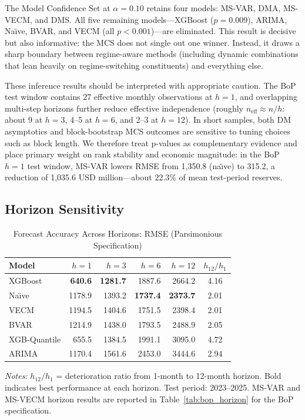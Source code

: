 \documentclass[12pt,a4paper]{article}
\begin{document}
The Model Confidence Set at $\alpha = 0.10$ retains four models: MS-VAR, DMA, MS-VECM, and DMS. All five remaining models---XGBoost ($p = 0.009$), ARIMA, Na\"{\i}ve, BVAR, and VECM (all $p < 0.001$)---are eliminated. This result is decisive but also informative: the MCS does not single out one winner. Instead, it draws a sharp boundary between regime-aware methods (including dynamic combinations that lean heavily on regime-switching constituents) and everything else.

These inference results should be interpreted with appropriate caution. The BoP test window contains 27 effective monthly observations at $h=1$, and overlapping multi-step horizons further reduce effective independence (roughly $n_{\text{eff}} \approx n/h$: about 9 at $h=3$, 4--5 at $h=6$, and 2--3 at $h=12$). In short samples, both DM asymptotics and block-bootstrap MCS outcomes are sensitive to tuning choices such as block length. We therefore treat p-values as complementary evidence and place primary weight on rank stability and economic magnitude: in the BoP $h=1$ test window, MS-VAR lowers RMSE from 1,350.8 (na\"{\i}ve) to 315.2, a reduction of 1,035.6 USD million---about 22.3\% of mean test-period reserves.

\subsection{Horizon Sensitivity}

\begin{table}[htbp]
\centering
\caption{Forecast Accuracy Across Horizons: RMSE (Parsimonious Specification)}
\label{tab:horizon}
\begin{tabular}{lrrrrc}
\toprule
Model & $h = 1$ & $h = 3$ & $h = 6$ & $h = 12$ & $h_{12}/h_1$ \\
\midrule
XGBoost & \textbf{640.6} & \textbf{1281.7} & 1887.6 & 2664.2 & 4.16 \\
Na\"{\i}ve & 1178.9 & 1393.2 & \textbf{1737.4} & \textbf{2373.7} & 2.01 \\
VECM & 1194.5 & 1404.6 & 1751.5 & 2398.4 & 2.01 \\
BVAR & 1214.9 & 1438.0 & 1793.5 & 2488.9 & 2.05 \\
XGB-Quantile & 655.5 & 1384.5 & 1991.1 & 3095.0 & 4.72 \\
ARIMA & 1170.4 & 1561.6 & 2453.0 & 3444.6 & 2.94 \\
\bottomrule
\end{tabular}
\begin{tablenotes}
\small
\item \textit{Notes:} $h_{12}/h_1$ = deterioration ratio from 1-month to 12-month horizon. Bold indicates best performance at each horizon. Test period: 2023--2025. MS-VAR and MS-VECM horizon results are reported in Table~\ref{tab:bop_horizon} for the BoP specification.
\end{tablenotes}
\end{table}
\end{document}
